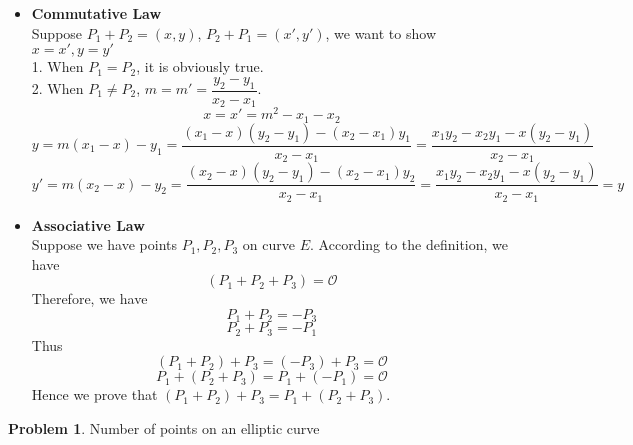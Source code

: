 \documentclass[12pt]{article}
\theoremstyle{definition}
\newtheorem{problem}{Problem}
\begin{document}
	\begin{itemize}
		\item \textbf{Commutative Law}\\
		Suppose $P_1+P_2=(x,y)$, $P_2+P_1=(x',y')$, we want to show $x=x',y=y'$\\
		1. When $P_1=P_2$, it is obviously true.\\
		2. When $P_1 \neq P_2$, $m=m'=\dfrac{y_2-y_1}{x_2-x_1}$.
		$$x=x'=m^2-x_1-x_2$$
		$$y=m(x_1-x)-y_1=\frac{(x_1-x)(y_2-y_1)-(x_2-x_1)y_1}{x_2-x_1}=\frac{x_1y_2-x_2y_1-x(y_2-y_1)}{x_2-x_1}$$
		$$y'=m(x_2-x)-y_2=\frac{(x_2-x)(y_2-y_1)-(x_2-x_1)y_2}{x_2-x_1}=\frac{x_1y_2-x_2y_1-x(y_2-y_1)}{x_2    -x_1}=y$$
		\item \textbf{Associative Law}\\
		Suppose we have points $P_1,P_2,P_3$ on curve $E$. According to the definition, we have 
		$$(P_1+P_2+P_3) = \mathcal{O}$$
		Therefore, we have 
		$$P_1+P_2=-P_3$$
		$$P_2+P_3=-P_1$$
		Thus
		$$(P_1+P_2)+P_3=(-P_3)+P_3=\mathcal{O}$$
		$$P_1+(P_2+P_3)=P_1+(-P_1)=\mathcal{O}$$
		Hence we prove that $(P_1+P_2)+P_3=P_1+(P_2+P_3)$.
	\end{itemize}
	\begin{problem}
		Number of points on an elliptic curve
	\end{problem}
\end{document}
